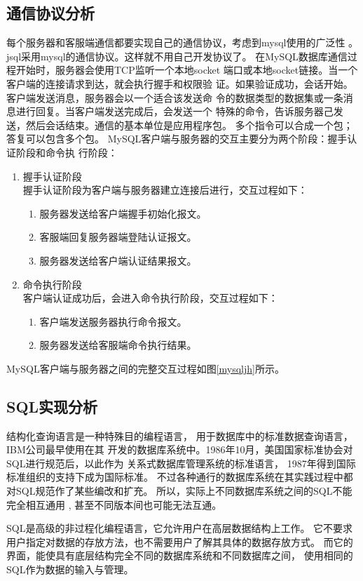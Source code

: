 \subsection{通信协议分析}
每个服务器和客服端通信都要实现自己的通信协议，考虑到mysql使用的广泛性
。jsql采用mysql的通信协议。这样就不用自己开发协议了。
在MySQL数据库通信过程开始时，服务器会使用TCP监听一个本地socket
端口或本地socket链接。当一个客户端的连接请求到达，就会执行握手和权限验
证。如果验证成功，会话开始。客户端发送消息，服务器会以一个适合该发送命
令的数据类型的数据集或一条消息进行回复。当客户端发送完成后，会发送一个
特殊的命令，告诉服务器己发送，然后会话结束。通信的基本单位是应用程序包。
多个指令可以合成一个包；答复可以包含多个包。
MySQL客户端与服务器的交互主要分为两个阶段：握手认证阶段和命令执
行阶段：
\begin{enumerate}
	\item 握手认证阶段\\
	握手认证阶段为客户端与服务器建立连接后进行，交互过程如下：
	\begin{enumerate}
		\item 服务器发送给客户端握手初始化报文。
		\item 客服端回复服务器端登陆认证报文。
		\item 服务器发送给客户端认证结果报文。
	\end{enumerate}
	\item 命令执行阶段\\
	客户端认证成功后，会进入命令执行阶段，交互过程如下：
	\begin{enumerate}
		\item 	客户端发送服务器执行命令报文。
		\item 服务器发送给客服端命令执行结果。
	\end{enumerate}
\end{enumerate}
MySQL客户端与服务器之间的完整交互过程如图\ref{mysqljh}所示。
\subsection{SQL实现分析}
结构化查询语言是一种特殊目的编程语言，
用于数据库中的标准数据查询语言，IBM公司最早使用在其
开发的数据库系统中。1986年10月，美国国家标准协会对SQL进行规范后，以此作为
关系式数据库管理系统的标准语言，
1987年得到国际标准组织的支持下成为国际标准。
不过各种通行的数据库系统在其实践过程中都对SQL规范作了某些编改和扩充。
所以，实际上不同数据库系统之间的SQL不能完全相互通用 ,
 甚至不同版本间也可能无法互通。

SQL是高级的非过程化编程语言，它允许用户在高层数据结构上工作。
它不要求用户指定对数据的存放方法，也不需要用户了解其具体的数据存放方式。
而它的界面，能使具有底层结构完全不同的数据库系统和不同数据库之间，
使用相同的SQL作为数据的输入与管理。

